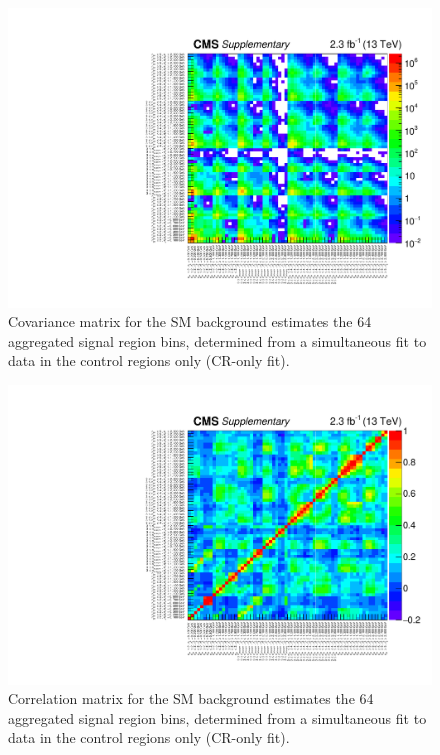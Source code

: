 \clearpage
\begin{figure}[!h]
  \begin{center}
    \includegraphics[width=\textwidth]{Supplementary/aggregated_covariance_aux.pdf} 
    \caption{Covariance matrix for the SM background estimates
      the 64 aggregated signal region bins, determined from a
      simultaneous fit to data in the control regions only (CR-only
      fit).
      \label{fig:aggr_corr} 
    }
  \end{center}
\end{figure}

\clearpage
\begin{figure}[!h]
  \begin{center}
    \includegraphics[width=\textwidth]{Supplementary/aggregated_correlation_aux.pdf} 
    \caption{Correlation matrix for the SM background estimates
      the 64 aggregated signal region bins, determined from a
      simultaneous fit to data in the control regions only (CR-only
      fit).
      \label{fig:aggr_corr} 
    }
  \end{center}
\end{figure}

